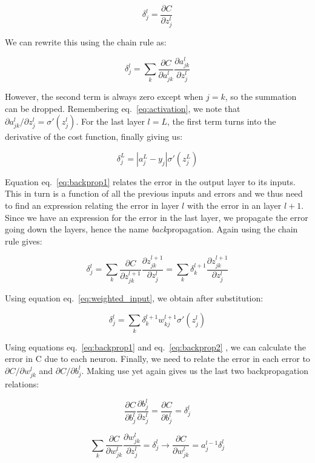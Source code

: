 \documentclass[12pt,a4paper,]{harvard-thesis}
\begin{document}
\[
\delta^l_j=\frac{\partial C}{\partial z^l_j}
\]

We can rewrite this using the chain rule as:

\[
\delta^l_j = \sum_k \frac{\partial C}{\partial a^l_{jk}}\frac{\partial a^l_{jk}}{\partial z^l_{j}} 
\]

However, the second term is always zero except when \(j=k\), so the
summation can be dropped. Remembering eq.~\ref{eq:activation}, we note
that \(\partial a^l_{jk}/\partial z^l_{j} = \sigma'(z^l_j)\). For the
last layer \(l = L\), the first term turns into the derivative of the
cost function, finally giving us:

\begin{equation}
\delta^L_j =  |a^L_j-y_j|\sigma'(z^L_j)
\label{eq:backprop1}\end{equation}

Equation eq.~\ref{eq:backprop1} relates the error in the output layer to
its inputs. This in turn is a function of all the previous inputs and
errors and we thus need to find an expression relating the error in
layer \(l\) with the error in an layer \(l+1\). Since we have an
expression for the error in the last layer, we propagate the error going
down the layers, hence the name \emph{back}propagation. Again using the
chain rule gives:

\[
\delta^l_j = \sum_k \frac{\partial C}{\partial z^{l+1}_{jk}}\frac{\partial z^{l+1}_{jk}}{\partial z^l_{j}} = \sum_k \delta^{l+1}_k\frac{\partial z^{l+1}_{jk}}{\partial z^l_{j}}
\]

Using equation eq.~\ref{eq:weighted_input}, we obtain after
substitution:

\begin{equation}
\delta^l_j = \sum_k\delta^{l+1}_kw^{l+1}_{kj}\sigma'(z^l_j)
\label{eq:backprop2}\end{equation}

Using equations eq.~\ref{eq:backprop1} and eq.~\ref{eq:backprop2} , we
can calculate the error in C due to each neuron. Finally, we need to
relate the error in each error to \(\partial C/\partial w^l_{jk}\) and
\(\partial C/\partial b^l_{j}\). Making use yet again gives us the last
two backpropagation relations:

\begin{equation}
\frac{\partial C}{\partial b^l_{j}}\frac{\partial b^l_{j}}{\partial z^l_{j}}=\frac{\partial C}{\partial b^l_{j}}=\delta^l_j
\label{eq:backprop3}\end{equation}

\begin{equation}
\sum_k\frac{\partial C}{\partial w^l_{jk}}\frac{\partial w^l_{jk}}{\partial z^l_{j}}=\delta^l_j\to \frac{\partial C}{\partial w^l_{jk}}=a^{l-1}_{j}\delta^l_j
\label{eq:backprop4}\end{equation}
\end{document}
